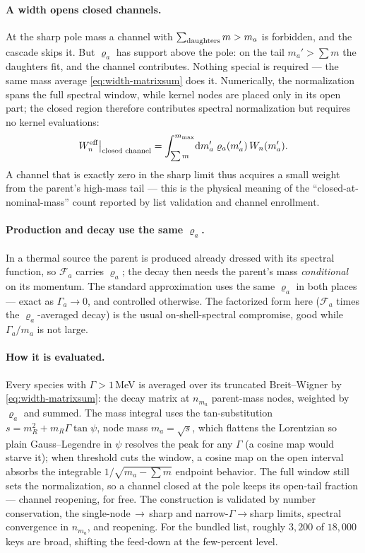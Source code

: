 \documentclass[11pt]{article}
\newcommand{\Fa}{\mathcal{F}_a}
\begin{document}
\paragraph{A width opens closed channels.}
At the sharp pole mass a channel with $\sum_{\rm daughters}m>m_a$ is
forbidden, and the cascade skips it.  But $\varrho_a$ has support above the
pole: on the tail $m_a'>\sum m$ the daughters fit, and the channel
contributes.  Nothing special is required --- the same mass average
\eqref{eq:width-matrixsum} does it.  Numerically, the normalization spans
the full spectral window, while kernel nodes are placed only in its open
part; the closed region therefore contributes spectral normalization but
requires no kernel evaluations:
\begin{equation}
W^{\rm eff}_n\big|_{\text{closed channel}}
=\int_{\sum m}^{m_{\max}}\!\mathrm{d}m_a'\;\varrho_a(m_a')\,W_n(m_a').
\end{equation}
A channel that is exactly zero in the sharp limit thus acquires a small
weight from the parent's high-mass tail --- this is the physical meaning of
the ``closed-at-nominal-mass'' count reported by list validation and channel
enrollment.

\paragraph{Production and decay use the same $\varrho_a$.}
In a thermal source the parent is produced already dressed with its spectral
function, so $\Fa$ carries $\varrho_a$; the decay then needs the parent's
mass \emph{conditional} on its momentum.  The standard approximation uses the
same $\varrho_a$ in both places --- exact as $\Gamma_a\to0$, and controlled
otherwise.  The factorized form here ($\Fa$ times the $\varrho_a$-averaged
decay) is the usual on-shell-spectral compromise, good while $\Gamma_a/m_a$
is not large.

\paragraph{How it is evaluated.}
Every species with $\Gamma>1$\,MeV is averaged over its truncated
Breit--Wigner by \eqref{eq:width-matrixsum}: the decay matrix at $n_{m_a}$
parent-mass nodes, weighted by $\varrho_a$ and summed.  The mass integral uses
the tan-substitution $s=m_R^2+m_R\Gamma\tan\psi$, node mass
$m_a=\sqrt{s}$, which flattens the Lorentzian so plain Gauss--Legendre in
$\psi$ resolves the peak for any $\Gamma$ (a cosine map would starve it);
when threshold cuts the window, a cosine map on the open interval absorbs the
integrable $1/\sqrt{m_a-\sum m}$ endpoint behavior.  The full window still
sets the normalization, so a channel closed at the pole keeps its open-tail
fraction --- channel reopening, for free.  The construction is validated by
number conservation, the single-node$\,\to\,$sharp and
narrow-$\Gamma\to$sharp limits, spectral convergence in $n_{m_a}$, and
reopening.  For the bundled list, roughly $3{,}200$ of $18{,}000$ keys are
broad, shifting the feed-down at the few-percent level.
\end{document}
